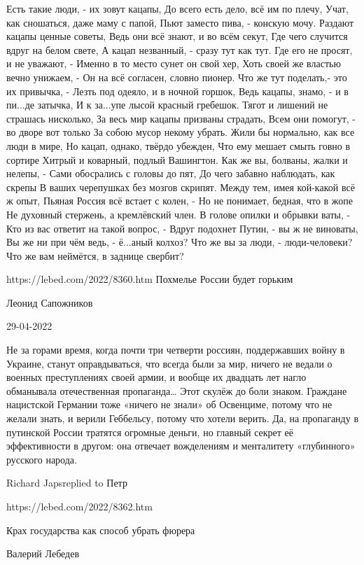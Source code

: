 Есть такие люди, - их зовут кацапы, До всего есть дело, всё им по плечу, Учат,
как сношаться, даже маму с папой, Пьют заместо пива, - конскую мочу. Раздают
кацапы ценные советы, Ведь они всё знают, и во всём секут, Где чего случится
вдруг на белом свете, А кацап незванный, - сразу тут как тут. Где его не
просят, и не уважают, - Именно в то место сунет он свой хер, Хоть своей же
властью вечно унижаем, - Он на всё согласен, словно пионер. Что же тут
поделать,- это их привычка, - Лезть под одеяло, и в ночной горшок, Ведь кацапы,
знамо, - и в пи...де затычка, И к за...упе лысой красный гребешок. Тягот и
лишений не страшась нисколько, За весь мир кацапы призваны страдать, Всем они
помогут, - во дворе вот только За собою мусор некому убрать. Жили бы нормально,
как все люди в мире, Но кацап, однако, твёрдо убежден, Что ему мешает смыть
говно в сортире Хитрый и коварный, подлый Вашингтон. Как же вы, болваны, жалки
и нелепы, - Сами обосрались с головы до пят, До чего забавно наблюдать, как
скрепы В ваших черепушках без мозгов скрипят. Между тем, имея кой-какой всё ж
опыт, Пьяная Россия всё встает с колен, - Но не понимает, бедная, что в жопе Не
духовный стержень, а кремлёвский член. В голове опилки и обрывки ваты, - Кто из
вас ответит на такой вопрос, - Вдруг подохнет Путин, - вы ж не виноваты, Вы же
ни при чём ведь, - ё...аный колхоз? Что же вы за люди, - люди-человеки? Что же
вам неймётся, в заднице свербит?


https://lebed.com/2022/8360.htm
Похмелье России будет горьким

Леонид Сапожников

29-04-2022

Не за горами время, когда почти три четверти
россиян,
поддержавших войну в Украине, станут оправдываться, что всегда
были за мир,
ничего не ведали о военных преступлениях своей армии, и вообще их
двадцать лет
нагло обманывала отечественная пропаганда… Этот скулёж до боли
знаком. Граждане
нацистской Германии тоже «ничего не знали» об Освенциме, потому
что не желали
знать, и верили Геббельсу, потому что хотели верить. Да, на
пропаганду в
путинской России тратятся огромные деньги, но главный секрет её
эффективности в
другом: она отвечает вожделениям и менталитету «глубинного»
русского
народа. 

Richard Japsreplied to Петр

https://lebed.com/2022/8362.htm

Крах государства как способ убрать фюрера

Валерий Лебедев


